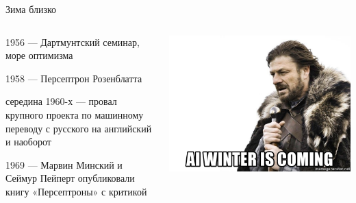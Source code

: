 \documentclass[notes,12pt, aspectratio=169]{beamer}
\newenvironment{wideitemize}{\itemize\addtolength{\itemsep}{10pt}}{\enditemize}
\begin{document}
\begin{frame}{Зима близко}
	\begin{columns}[T]%
		\begin{column}{.55\textwidth}%
		\begin{wideitemize} 
		\item 1956 — Дартмунтский семинар, море оптимизма
		
		\item 1958 — Персептрон Розенблатта
		
		\item середина 1960-х — провал крупного проекта по машинному переводу с русского на английский и наоборот 
		
		\item 1969 — Марвин Минский и Сеймур Пейперт опубликовали книгу «Персептроны» с критикой 
		
		\end{wideitemize} 
		\end{column}%
		\hfill%
		\begin{column}{.45\textwidth}
		\begin{center}
		\includegraphics[width=.99\linewidth]{stark.jpg}
		\end{center}
		\end{column}%
	\end{columns}%
\end{frame}
\end{document}
